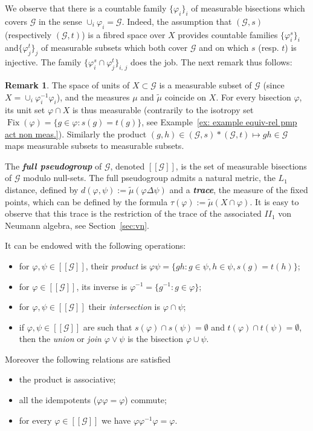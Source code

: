 \documentclass[10pt]{amsart}
\theoremstyle{definition}
\newtheorem{rema}[cdrthm]{Remark}
\newcommand{\defin}[1]{\textbf{\emph{#1}}}
\newcommand{\cg}{\mathcal{G}}
\DeclareMathOperator{\Fix}{Fix}
\newcommand{\ph}{\varphi}
\begin{document}
We observe that there is a countable family $\{\ph_i\}_i$ of measurable bisections which covers $\cg$ in the sense $\cup_i \ph_i=\cg$. Indeed, the assumption that $(\cg,s)$ (respectively $(\cg,t)$) is a fibred space over $X$ provides countable families $\{\ph_i^s\}_i$ and$\{\ph_j^t\}_j$ of measurable subsets which both cover $\cg$ and on which $s$ (resp. $t$) is injective. The family $\{\ph_i^s\cap \ph_j^t\}_{i,\,j}$ does the job. The next remark thus follows:
\begin{rema}\label{rem: X is measurable in G}
The space of units of $X\subset \cg$ is a measurable subset of $\cg$ (since $X = \cup_i \ph_i^{-1} \ph_i$), and the measures $\mu$ and $\widetilde \mu$ coincide on $X$. For every bisection $\ph$, its unit set $\ph\cap X$ is thus measurable (contrarily to the isotropy set $\Fix(\ph)=\{g\in \ph: s(g)=t(g)\}$, see Example~\ref{ex: example equiv-rel pmp act non meas.}). Similarly the product $(g,h)\in (\cg,s)\ast(\cg,t)\mapsto gh\in\cg$ maps measurable subsets to measurable subsets.
\end{rema}

The \defin{full pseudogroup} of $\cg$, denoted $[[\cg]]$, is the set of measurable bisections of $\cg$ modulo null-sets. The full pseudogroup admits a natural metric, the $L_1$ distance, defined by $d(\ph,\psi) := \widetilde \mu(\ph \Delta \psi)$ and a \defin{trace}, the measure of the fixed points, which can be defined by the formula $\tau(\ph):=\widetilde \mu(X\cap \ph)$. It is easy to observe that this trace is the restriction of the trace of the associated $II_1$ von Neumann algebra, see Section~\ref{sec:vn}.

It can be endowed with the following operations:
\begin{itemize}
\item for $\ph,\psi \in [[\cg]]$, their \emph{product} is $\ph\psi=\{gh:g\in \psi,h \in \psi, s(g)=t(h)\}$;
\item for $\ph\in [[\cg]]$, its inverse is $\ph^{-1}= \{g^{-1}: g \in \ph\}$;
\item for $\ph,\psi \in [[\cg]]$ their \emph{intersection} is $\ph\cap \psi$;
\item if $\ph,\psi\in [[\cg]]$ are such that $s(\ph) \cap s(\psi) = \emptyset$ and $t(\ph) \cap t(\psi)=\emptyset$, then the \emph{union} or \emph{join} $\ph\vee \psi$ is the bisection $\ph \cup \psi$.
\end{itemize}
Moreover the following relations are satisfied
\begin{itemize}
\item the product is associative;
\item all the idempotents ($\ph \ph=\ph$) commute;
\item for every $\ph\in [[\cg]]$ we have $\ph \ph^{-1}\ph=\ph$.
\end{itemize}
\end{document}
